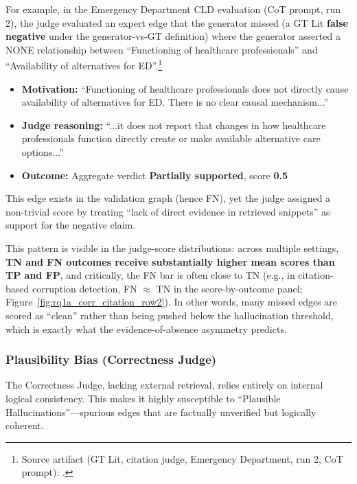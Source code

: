 For example, in the Emergency Department CLD evaluation (CoT prompt, run 2), the judge evaluated an expert edge that the generator missed (a GT Lit \textbf{false negative} under the generator-vs-GT definition) where the generator asserted a NONE relationship between ``Functioning of healthcare professionals'' and ``Availability of alternatives for ED''.\footnote{Source artifact (GT Lit, citation judge, Emergency Department, run 2, CoT prompt): \texttt{}.}%
\begin{itemize}[noitemsep]
    \item \textbf{Motivation:} ``Functioning of healthcare professionals does not directly cause availability of alternatives for ED. There is no clear causal mechanism...''
    \item \textbf{Judge reasoning:} ``...it does not report that changes in how healthcare professionals function directly create or make available alternative care options...''
    \item \textbf{Outcome:} Aggregate verdict \textbf{Partially supported}, score \textbf{0.5}
\end{itemize}

This edge exists in the validation graph (hence FN), yet the judge assigned a non-trivial score by treating ``lack of direct evidence in retrieved snippets'' as support for the negative claim.

This pattern is visible in the judge-score distributions: across multiple settings, \textbf{TN and FN outcomes receive substantially higher mean scores than TP and FP}, and critically, the FN bar is often close to TN (e.g., in citation-based corruption detection, FN $\approx$ TN in the score-by-outcome panel; Figure~\ref{fig:rq1a_corr_citation_row2}). In other words, many missed edges are scored as ``clean'' rather than being pushed below the hallucination threshold, which is exactly what the evidence-of-absence asymmetry predicts.

\subsubsection{Plausibility Bias (Correctness Judge)}

The Correctness Judge, lacking external retrieval, relies entirely on internal logical consistency. This makes it highly susceptible to ``Plausible Hallucinations''---spurious edges that are factually unverified but logically coherent.

